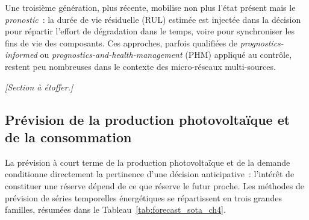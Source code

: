 Une troisième génération, plus récente, mobilise non plus l'état présent mais le \emph{pronostic}~: la durée de vie résiduelle (RUL) estimée est injectée dans la décision pour répartir l'effort de dégradation dans le temps, voire pour synchroniser les fins de vie des composants. Ces approches, parfois qualifiées de \textit{prognostics-informed} ou \textit{prognostics-and-health-management} (PHM) appliqué au contrôle, restent peu nombreuses dans le contexte des micro-réseaux multi-sources.


\medskip
\noindent\textit{[Section à étoffer.]}

\subsection{Prévision de la production photovoltaïque et de la consommation}
\label{subsec:forecast_sota}

La prévision à court terme de la production photovoltaïque et de la demande conditionne directement la pertinence d'une décision anticipative~: l'intérêt de constituer une réserve dépend de ce que réserve le futur proche. Les méthodes de prévision de séries temporelles énergétiques se répartissent en trois grandes familles, résumées dans le Tableau~\ref{tab:forecast_sota_ch4}.


